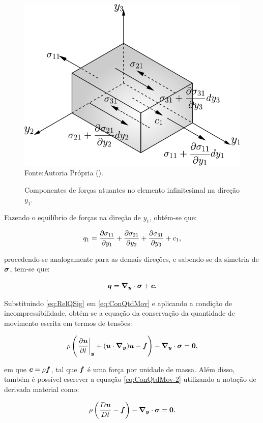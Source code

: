 \begin{figure}[h!]
    \centering
    \caption{Componentes de forças atuantes no elemento infinitesimal na direção $y_1$.}
    \includegraphics[width=.5\linewidth]{Figuras/EqFor.pdf}
    \\Fonte:Autoria Própria (\the\year).
    \label{fig:EqFor}
\end{figure}

Fazendo o equilíbrio de forças na direção de $y_1$, obtém-se que:

\begin{equation}
    q_1=\frac{\partial{\sigma_{11}}}{\partial{y_1}}+\frac{\partial{\sigma_{21}}}{\partial{y_2}}+\frac{\partial{\sigma_{31}}}{\partial{y_3}}+c_1\text{,}
\end{equation}

\noindent procedendo-se analogamente para as demais direções, e sabendo-se da simetria de $\boldsymbol{\sigma}$, tem-se que:

\begin{equation}
    \boldsymbol{q}=\boldsymbol{\nabla_y}\cdot\boldsymbol{\sigma}+\boldsymbol{c}\text{.}
    \label{eq:RelQSig}
\end{equation}

Substituindo \eqref{eq:RelQSig} em \eqref{eq:ConQtdMov} e aplicando a condição de incompressibilidade, obtém-se a equação da conservação da quantidade de movimento escrita em termos de tensões:

\begin{equation}
    \rho\left({\left.\frac{\partial \boldsymbol{u}}{\partial t}\right|_{\boldsymbol{y}}+(\boldsymbol{u}\cdot\boldsymbol{\nabla_y})\boldsymbol{u}-\boldsymbol{f}}\right)-\boldsymbol{\nabla_y}\cdot\boldsymbol{\sigma}=\boldsymbol{0}\text{,}
    \label{eq:ConQtdMov-2}
\end{equation}

\noindent em que $\boldsymbol{c}=\rho\boldsymbol{f}$, tal que $\boldsymbol{f}$ é uma força por unidade de massa. Além disso, também é possível escrever a equação \eqref{eq:ConQtdMov-2} utilizando a notação de derivada material como:

\begin{equation}
    \rho\left({\frac{D\boldsymbol{u}}{Dt}-\boldsymbol{f}}\right)-\boldsymbol{\nabla_y}\cdot\boldsymbol{\sigma}=\boldsymbol{0}\text{.}
    \label{eq:ConQtdMov-3}
\end{equation}

